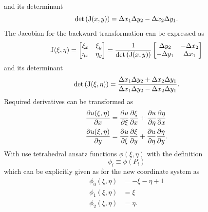 and its determinant
\begin{equation}
	\det\left(\mathrm{J}(x, y)\right) = \Delta x_1 \Delta y_2 - \Delta x_2 \Delta y_1.
\end{equation}
The Jacobian for the backward transformation can be expressed as
\begin{equation}
	\mathrm{J}(\xi, \eta) = 
	\begin{bmatrix}
	\xi_{x} & \xi_{y} \\
	\eta_{x} & \eta_{y}
	\end{bmatrix}
	= \frac{1}{\det\left(\mathrm{J}(x,y)\right)}
	\begin{bmatrix}
	\Delta y_{2} & -\Delta x_{2}\\
	-\Delta y_{1} & \Delta x_{1}
	\end{bmatrix}
\end{equation}
and its determinant
\begin{equation}
	\det\left( \mathrm{J}(\xi, \eta) \right) = \frac{\Delta x_1 \Delta y_2 + \Delta x_2 \Delta y_1}{\Delta x_1 \Delta y_2 - \Delta x_2 \Delta y_1}.
\end{equation}
Required derivatives can be transformed as
\begin{align}
	\pdv{u(\xi, \eta)}{x} &= \pdv{u}{\xi}\pdv{\xi}{x} + \pdv{u}{\eta}\pdv{\eta}{x}\\
	\pdv{u(\xi, \eta)}{y} &= \pdv{u}{\xi}\pdv{\xi}{y} + \pdv{u}{\eta}\pdv{\eta}{y}.
\end{align}
With use tetrahedral ansatz functions $\phi(\xi, \eta)$ with the definition
\begin{equation}
	\phi_i \equiv \phi(P_i)
\end{equation}
which can be explicitly given as for the new coordinate system as
\begin{align}
	\phi_0(\xi, \eta) &= -\xi - \eta  + 1\\
	\phi_1(\xi, \eta) &= \xi\\
	\phi_2(\xi, \eta) &= \eta.
\end{align}